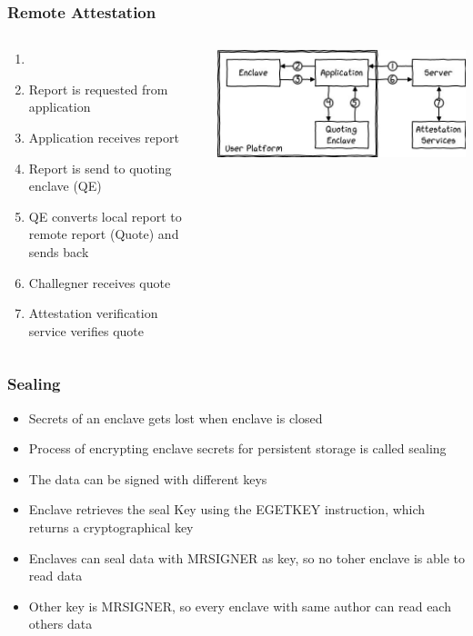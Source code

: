 \begin{frame}
    \frametitle{Remote Attestation}
    \begin{columns}
        \begin{column}{0.4\textwidth}
            \begin{enumerate}[<+->]
                \item 
                \item Report is requested from application
                \item Application receives report
                \item Report is send to quoting enclave (QE)
                \item QE converts local report to remote report (Quote) and sends back
                \item Challegner receives quote
                \item Attestation verification service verifies quote
            \end{enumerate}
        \end{column}
        \begin{column}{0.6\textwidth}
            \includegraphics[scale=0.4]{Images/remote_attestation.png}
        \end{column}
    \end{columns}
\end{frame}

\begin{frame}
    \frametitle{Sealing}
    \begin{itemize}[<+->]
        \item Secrets of an enclave gets lost when enclave is closed
        \item Process of encrypting enclave secrets for persistent storage is called sealing
        \item The data can be signed with different keys
        \item Enclave retrieves the seal Key using the EGETKEY instruction, which returns a cryptographical key
        \item Enclaves can seal data with MRSIGNER as key, so no toher enclave is able to read data
        \item Other key is MRSIGNER, so every enclave with same author can read each others data
    \end{itemize}
\end{frame}